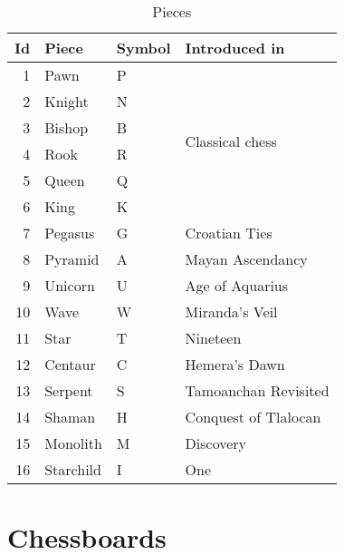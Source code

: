\begin{table}[!h]
\centering
\begin{tabular}{ rlll }
\toprule
\textbf{Id} & \textbf{Piece} & \textbf{Symbol} & \textbf{Introduced in} \\
\midrule
1 & Pawn & P & \multirow{6}{*}{Classical chess} \\
2 & Knight & N & \\
3 & Bishop & B & \\
4 & Rook & R & \\
5 & Queen & Q & \\
6 & King & K & \\ \cmidrule{1-4}
7 & Pegasus & G & Croatian Ties \\
8 & Pyramid & A & Mayan Ascendancy \\
9 & Unicorn & U & Age of Aquarius \\
10 & Wave & W & Miranda's Veil \\
11 & Star & T & Nineteen \\
12 & Centaur & C & Hemera's Dawn \\
13 & Serpent & S & Tamoanchan Revisited \\
14 & Shaman & H & Conquest of Tlalocan \\
15 & Monolith & M & Discovery \\
16 & Starchild & I & One \\
\bottomrule
\end{tabular}
\caption{Pieces}
\label{tbl:Appendix/Pieces XXX}
\end{table}

\clearpage %

\section*{Chessboards}
\label{sec:Appendix/Chessboards}


